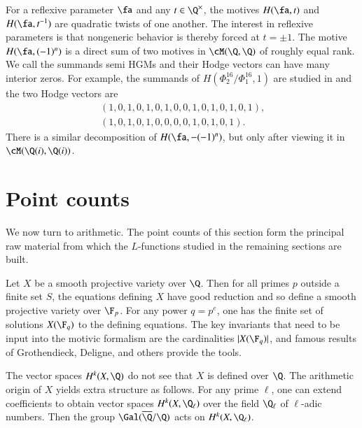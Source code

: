 \documentclass{notices}
\numberwithin{equation}{section}
\numberwithin{table}{section}
\numberwithin{figure}{section}
\begin{document}
{  
For a reflexive parameter $\fa$ and any $t \in \Q^\times$, 
the motives $H(\fa,t)$ and $H(\fa,t^{-1})$
are quadratic twists of one another.  
The interest in reflexive parameters is that 
nongeneric behavior is thereby forced at $t=\pm 1$.   
The motive  
$H(\fa,(-1)^n)$ is a direct sum of 
two motives  in $\cM(\Q,\Q)$ of roughly equal
rank.  We call the summands semi HGMs and their Hodge vectors
can have many interior zeros.   For example, the summands of 
$H(\Phi_2^{16}/\Phi_1^{16},1)$ 
are studied in \cite{Rob} and the two Hodge vectors
are 
\begin{equation}
\label{dyadic16}
\begin{array}{c}
\, (1,0,1,0,1,0,1,0,0,1,0,1,0,1,0,1), \\
\, (1,0,1,0,1,0,0,0,0,1,0,1,0,1).
\end{array}
\end{equation}
There is a similar 
decomposition of $H(\fa,-(-1)^n)$, but only
after viewing it in $\cM(\Q(i),\Q(i))$.  



  





\section{Point counts}
\label{sect:arithmetic}

We now turn to arithmetic.  The point counts of this section form the
principal raw material from which the $L$-functions studied 
in the remaining sections are built.

Let $X$ be a smooth projective variety
over $\Q$.  Then for all primes $p$ outside a finite set $S$, the
equations defining $X$ have good reduction and so define
a smooth projective variety over $\F_p$.  For any power $q=p^e$, 
one has the finite set of solutions $X(\F_q)$ to the defining
equations.  The key invariants that need to be input into 
the motivic formalism are the cardinalities $|X(\F_q)|$,
and famous results of Grothendieck, Deligne, and 
others provide the tools.  

The vector spaces $H^k(X,\Q)$ do not see that $X$ is 
defined over $\Q$.  The arithmetic origin of $X$ 
yields extra structure as follows.  For any prime $\ell$, one
can extend coefficients to obtain vector spaces 
$H^k(X,\Q_\ell)$ over the field $\Q_\ell$ of $\ell$-adic
numbers.  Then the group $\Gal(\overline{\Q}/\Q)$ 
acts on $H^k(X,\Q_\ell)$.   
 
}
\end{document}
